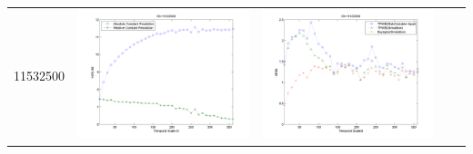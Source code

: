 \documentclass[11pt]{article}
\begin{document}
\begin{table}[H]
{\begin{tabular}{c  c   c   c c }
11532500&\begin{minipage}{.4\textwidth}\includegraphics[width=\linewidth]{resultgraph/11532500e.png}\end{minipage}
&\begin{minipage}{.4\textwidth}\includegraphics[width=\linewidth]{resultgraph/11532500MI.png}\end{minipage}

\end{tabular}}
\end{table}
\end{document}

